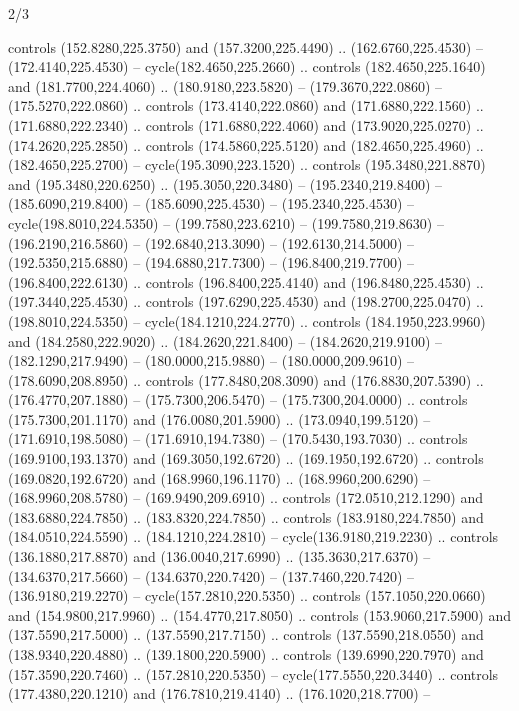 \begin{flagdescription}{2/3}
\begin{scope}[xshift=0.5\flaglength,yshift=0.5\flagwidth,scale=\stretchfactor]
\begin{scope}[scale=0.001645\flagwidth,yshift=65mm,xshift=-63mm]
\begin{scope}[y=0.80pt, x=0.80pt, yscale=-1,]
\begin{scope}[cm={{1.33333,0.0,0.0,1.33333,(0.0,1e-05)}}]
  controls (152.8280,225.3750) and (157.3200,225.4490) .. (162.6760,225.4530) --
  (172.4140,225.4530) -- cycle(182.4650,225.2660) .. controls
  (182.4650,225.1640) and (181.7700,224.4060) .. (180.9180,223.5820) --
  (179.3670,222.0860) -- (175.5270,222.0860) .. controls (173.4140,222.0860) and
  (171.6880,222.1560) .. (171.6880,222.2340) .. controls (171.6880,222.4060) and
  (173.9020,225.0270) .. (174.2620,225.2850) .. controls (174.5860,225.5120) and
  (182.4650,225.4960) .. (182.4650,225.2700) -- cycle(195.3090,223.1520) ..
  controls (195.3480,221.8870) and (195.3480,220.6250) .. (195.3050,220.3480) --
  (195.2340,219.8400) -- (185.6090,219.8400) -- (185.6090,225.4530) --
  (195.2340,225.4530) -- cycle(198.8010,224.5350) -- (199.7580,223.6210) --
  (199.7580,219.8630) -- (196.2190,216.5860) -- (192.6840,213.3090) --
  (192.6130,214.5000) -- (192.5350,215.6880) -- (194.6880,217.7300) --
  (196.8400,219.7700) -- (196.8400,222.6130) .. controls (196.8400,225.4140) and
  (196.8480,225.4530) .. (197.3440,225.4530) .. controls (197.6290,225.4530) and
  (198.2700,225.0470) .. (198.8010,224.5350) -- cycle(184.1210,224.2770) ..
  controls (184.1950,223.9960) and (184.2580,222.9020) .. (184.2620,221.8400) --
  (184.2620,219.9100) -- (182.1290,217.9490) -- (180.0000,215.9880) --
  (180.0000,209.9610) -- (178.6090,208.8950) .. controls (177.8480,208.3090) and
  (176.8830,207.5390) .. (176.4770,207.1880) -- (175.7300,206.5470) --
  (175.7300,204.0000) .. controls (175.7300,201.1170) and (176.0080,201.5900) ..
  (173.0940,199.5120) -- (171.6910,198.5080) -- (171.6910,194.7380) --
  (170.5430,193.7030) .. controls (169.9100,193.1370) and (169.3050,192.6720) ..
  (169.1950,192.6720) .. controls (169.0820,192.6720) and (168.9960,196.1170) ..
  (168.9960,200.6290) -- (168.9960,208.5780) -- (169.9490,209.6910) .. controls
  (172.0510,212.1290) and (183.6880,224.7850) .. (183.8320,224.7850) .. controls
  (183.9180,224.7850) and (184.0510,224.5590) .. (184.1210,224.2810) --
  cycle(136.9180,219.2230) .. controls (136.1880,217.8870) and
  (136.0040,217.6990) .. (135.3630,217.6370) -- (134.6370,217.5660) --
  (134.6370,220.7420) -- (137.7460,220.7420) -- (136.9180,219.2270) --
  cycle(157.2810,220.5350) .. controls (157.1050,220.0660) and
  (154.9800,217.9960) .. (154.4770,217.8050) .. controls (153.9060,217.5900) and
  (137.5590,217.5000) .. (137.5590,217.7150) .. controls (137.5590,218.0550) and
  (138.9340,220.4880) .. (139.1800,220.5900) .. controls (139.6990,220.7970) and
  (157.3590,220.7460) .. (157.2810,220.5350) -- cycle(177.5550,220.3440) ..
  controls (177.4380,220.1210) and (176.7810,219.4140) .. (176.1020,218.7700) --

\end{scope}
\end{scope}
\end{scope}
\end{scope}
\end{flagdescription}
